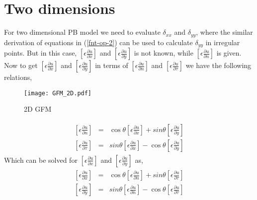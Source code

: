   
\section{Two dimensions}
For two dimensional PB model we need to evaluate $\delta_{xx}$ and $\delta_{yy}$, where the similar derivation of equations in (\ref{fnt-op-2}) can be used to calculate $\delta_{yy}$ in irregular points. But in this case,  $\left[ \epsilon \frac{\partial u}{\partial x} \right]$ and $\left[ \epsilon \frac{\partial u}{\partial y} \right]$ is not known, while $\left[ \epsilon \frac{\partial u}{\partial n} \right]$ is given. Now to get $\left[ \epsilon \frac{\partial u}{\partial x} \right]$ and $\left[ \epsilon \frac{\partial u}{\partial y} \right]$ in terms of $\left[ \epsilon \frac{\partial u}{\partial n} \right]$ and $\left[ \epsilon \frac{\partial u}{\partial \tau} \right]$ we have the following relations,  
\begin{figure}[ht]
\begin{center}
\texttt{[image: GFM\_2D.pdf]}
\caption{2D GFM}
\label{fig_gfm_2D}
\end{center}
\end{figure}

\begin{eqnarray}
\begin{aligned}
			\left[\epsilon \frac{\partial u}{\partial n}\right] &=& \cos \theta \left[\epsilon \frac{\partial u}{\partial x}\right] + sin \theta \left[\epsilon \frac{\partial u}{\partial y}\right]\label{epun} \\
			\left[\epsilon \frac{\partial u}{\partial \tau}\right] &=& sin \theta \left[\epsilon \frac{\partial u}{\partial x}\right] - \cos \theta\left[\epsilon \frac{\partial u}{\partial y}\right]\label{eput}	
\end{aligned}		
\end{eqnarray}
Which can be solved for $ \left[\epsilon \frac{\partial u}{\partial x}\right]$ and $\left[\epsilon \frac{\partial u}{\partial y}\right]$ as,
\begin{eqnarray}
\begin{aligned}
	\left[\epsilon \frac{\partial u}{\partial x}\right] &=& \cos \theta \left[\epsilon \frac{\partial u}{\partial n}\right] +sin \theta \left[\epsilon \frac{\partial u}{\partial \tau}\right]\label{epux1} \\
	\left[\epsilon \frac{\partial u}{\partial y}\right] &=& sin \theta \left[\epsilon \frac{\partial u}{\partial n}\right] -\cos \theta \left[\epsilon \frac{\partial u}{\partial \tau}\right]\label{epuy1}
\end{aligned}	
\end{eqnarray}

